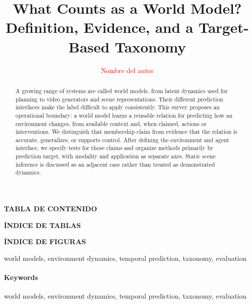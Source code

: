 \IfFileExists{IEEEtran.cls}{\documentclass[journal]{IEEEtran}}{\documentclass[twocolumn]{article}}
\newcommand{\USFQkeywords}[1]{%
  \ifdefined\IEEEkeywords\begin{IEEEkeywords}#1\end{IEEEkeywords}%
  \else\paragraph{Keywords} #1\fi}
\newenvironment{customfontsize}{
    \fontsize{12}{14}\selectfont
}{}
\begin{document}
\newpage

\begin{center}
\textbf{\fontsize{14}{16}\selectfont TABLA DE CONTENIDO}
\end{center}

\renewcommand{\contentsname}{}
\begin{customfontsize}
    \tableofcontents
\end{customfontsize}


\newpage

\begin{center}
    \textbf{\fontsize{14}{16}\selectfont ÍNDICE DE TABLAS}
\end{center}


\renewcommand{\listtablename}{} %

\begin{customfontsize}
    \listoftables
\end{customfontsize}


\newpage
\begin{center}
    \textbf{\fontsize{14}{16}\selectfont ÍNDICE DE FIGURAS}
\end{center}


\renewcommand{\listfigurename}{} %


\begin{customfontsize}
    \listoffigures
\end{customfontsize}

\newpage
\setlength{\dblfloatsep}{6pt}
\setlength{\dbltextfloatsep}{8pt}
\twocolumn
\normalsize

\title{What Counts as a World Model? Definition, Evidence, and a Target-Based Taxonomy}
\author{\textcolor{red}{Nombre del autor}}
\date{}
\maketitle
\begin{abstract}
A growing range of systems are called world models, from latent dynamics used for planning to video generators and scene representations. Their different prediction interfaces make the label difficult to apply consistently. This survey proposes an operational boundary: a world model learns a reusable relation for predicting how an environment changes, from available context and, when claimed, actions or interventions. We distinguish that membership claim from evidence that the relation is accurate, generalizes, or supports control. After defining the environment and agent interface, we specify tests for those claims and organize methods primarily by prediction target, with modality and application as separate axes. Static scene inference is discussed as an adjacent case rather than treated as demonstrated dynamics.
\end{abstract}
\USFQkeywords{world models, environment dynamics, temporal prediction, taxonomy, evaluation}
\end{document}
